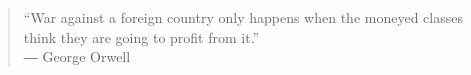 \begin{quote}
	“War against a foreign country only happens when the moneyed classes think they are going to profit from it.”\\
	― George Orwell~\cite{orwell-quote}
\end{quote}



